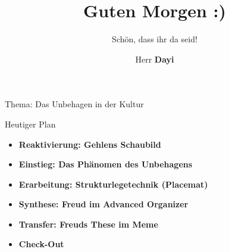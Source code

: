 \documentclass{beamer}
\title{Guten Morgen :)}
\subtitle{Schön, dass ihr da seid!}
\author{Herr \textbf{Dayi}}
\institute{Philosophie Q1}
\date{}
\begin{document}

\begin{frame}[t]{Thema: Das Unbehagen in der Kultur}
\end{frame}

\begin{frame}[t]{\faListUl \enskip Heutiger Plan}
\vspace*{0.3cm}
\begin{itemize}
    \setlength{\itemsep}{9pt}
    
    \item<1->[1.] \textbf{\faHistory \enskip Reaktivierung: Gehlens Schaubild}
    
    \item<2->[2.] \textbf{\faQuoteLeft \enskip Einstieg: Das Phänomen des Unbehagens}
    
    \item<3->[3.] \textbf{\faPuzzlePiece \enskip Erarbeitung: Strukturlegetechnik (Placemat)}
    
    \item<4->[4.] \textbf{\faCompass \enskip Synthese: Freud im Advanced Organizer}
    
    \item<5->[5.] \textbf{\faImages \enskip Transfer: Freuds These im Meme}
    
    \item<6->[6.] \textbf{\faCheckCircle \enskip Check-Out}
    
\end{itemize}
\end{frame}
\end{document}

